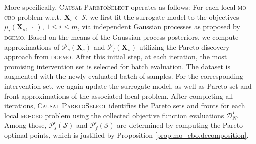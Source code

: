 More specifically, \textsc{Causal ParetoSelect} operates as follows: For each local \textsc{mo-cbo} problem w.r.t. $\mathbf{X}_s \in \mathcal{S}$, we first fit the surrogate model to the objectives $\mu_i(\mathbf{X}_s, \ \cdot \ )$, $1\leq i\leq m$, via independent Gaussian processes as proposed by \textsc{dgemo}. Based on the means of the Gaussian process posteriors, we compute approximations of $\mathcal{P}_s^{\textsf{l}}(\mathbf{X}_s)$ and $\mathcal{P}_f^{\textsf{l}}(\mathbf{X}_s)$ utilizing the Pareto discovery approach from \textsc{dgemo}. After this initial step, at each iteration, the most promising intervention set is selected for batch evaluation. The dataset is augmented with the newly evaluated batch of samples. 
For the corresponding intervention set, we again update the surrogate model, as well as Pareto set and front approximations of the associated local problem. 
After completing all iterations, \textsc{Causal ParetoSelect} identifies the Pareto sets and fronts for each local \textsc{mo-cbo} problem using the collected objective function evaluations $\mathcal{D}_N^{I}$. 
Among those, $\mathcal{P}_s^{\textsf{c}}(\mathcal{S})$ and $\mathcal{P}_f^{\textsf{c}}(\mathcal{S})$ are determined by computing the Pareto-optimal points, which is justified by Proposition \ref{prop:mo_cbo.decomposition}.


